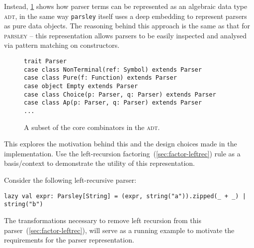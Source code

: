 \documentclass[../../main.tex]{subfiles}
\begin{document}
Instead, \cref{fig:parser-adt} shows how parser terms can be represented as an algebraic data type \textsc{adt}, in the same way \texttt{parsley} itself uses a deep embedding to represent parsers as pure data objects.
The reasoning behind this approach is the same as that for \textsc{parsley} -- this representation allows parsers to be easily inspected and analysed via pattern matching on constructors.

\begin{figure}[htbp]
\begin{verbatim}
trait Parser
case class NonTerminal(ref: Symbol) extends Parser
case class Pure(f: Function) extends Parser
case object Empty extends Parser
case class Choice(p: Parser, q: Parser) extends Parser
case class Ap(p: Parser, q: Parser) extends Parser
...
\end{verbatim}
\caption{A subset of the core combinators in the  \textsc{adt}.}
\label{fig:parser-adt}
\end{figure}


This  explores the motivation behind this and the design choices made in the implementation.
Use the left-recursion factoring~(\cref{sec:factor-leftrec}) rule as a basis/context to demonstrate the utility of this representation.


Consider the following left-recursive parser:
\begin{verbatim}
lazy val expr: Parsley[String] = (expr, string("a")).zipped(_ + _) | string("b")
\end{verbatim}
The transformations necessary to remove left recursion from this parser~(\cref{sec:factor-leftrec}), will serve as a running example to motivate the requirements for the parser representation.
\end{document}
